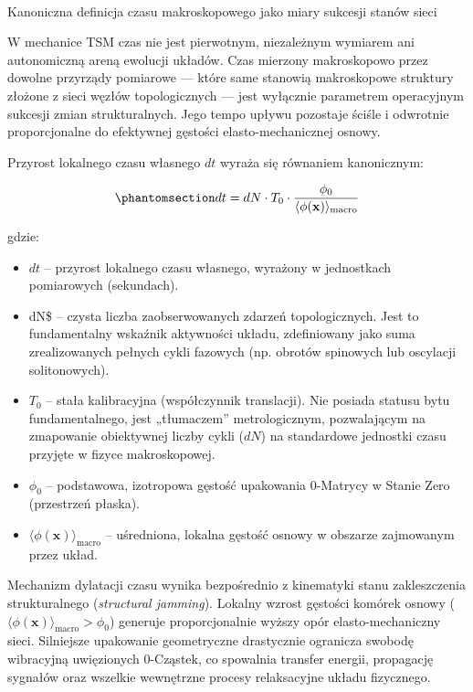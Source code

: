 \documentclass[
  polish,
  letterpaper,
  DIV=11,
  numbers=noendperiod,
  oneside]{scrartcl}
\makeatletter
\let\oldparagraph\paragraph
\renewcommand{\paragraph}{
    \@ifstar
      \xxxParagraphStar
      \xxxParagraphNoStar
  }
\newcommand{\xxxParagraphStar}[1]{\oldparagraph*{#1}\mbox{}}
\newcommand{\xxxParagraphNoStar}[1]{\oldparagraph{#1}\mbox{}}
\providecommand{\tightlist}{%
  \setlength{\itemsep}{0pt}\setlength{\parskip}{0pt}}
\makeatother
\begin{document}
\paragraph{Kanoniczna definicja czasu makroskopowego jako miary sukcesji
stanów sieci}\label{sec-1-2-3}

W mechanice TSM czas nie jest pierwotnym, niezależnym wymiarem ani
autonomiczną areną ewolucji układów. Czas mierzony makroskopowo przez
dowolne przyrządy pomiarowe --- które same stanowią makroskopowe
struktury złożone z sieci węzłów topologicznych --- jest wyłącznie
parametrem operacyjnym sukcesji zmian strukturalnych. Jego tempo upływu
pozostaje ściśle i odwrotnie proporcjonalne do efektywnej gęstości
elasto-mechanicznej osnowy.

Przyrost lokalnego czasu własnego \(dt\) wyraża się równaniem
kanonicznym:

\begin{equation}\protect\phantomsection\label{eq-1-2-5}{dt = dN \cdot T_0 \cdot \frac{\phi_0}{\langle\phi(\mathbf{x})\rangle_{\text{macro}}}}\end{equation}

gdzie:

\begin{itemize}
\tightlist
\item
  \(dt\) -- przyrost lokalnego czasu własnego, wyrażony w jednostkach
  pomiarowych (sekundach).
\item
  dN\$ -- czysta liczba zaobserwowanych zdarzeń topologicznych. Jest to
  fundamentalny wskaźnik aktywności układu, zdefiniowany jako suma
  zrealizowanych pełnych cykli fazowych (np. obrotów spinowych lub
  oscylacji solitonowych).
\item
  \(T_0\) -- stała kalibracyjna (współczynnik translacji). Nie posiada
  statusu bytu fundamentalnego, jest „tłumaczem'' metrologicznym,
  pozwalającym na zmapowanie obiektywnej liczby cykli (\(dN\)) na
  standardowe jednostki czasu przyjęte w fizyce makroskopowej.
\item
  \(\phi_0\) -- podstawowa, izotropowa gęstość upakowania 0-Matrycy w
  Stanie Zero (przestrzeń płaska).
\item
  \(\langle\phi(\mathbf{x})\rangle_{\text{macro}}\) -- uśredniona,
  lokalna gęstość osnowy w obszarze zajmowanym przez układ.
\end{itemize}

Mechanizm dylatacji czasu wynika bezpośrednio z kinematyki stanu
zakleszczenia strukturalnego (\emph{structural jamming}). Lokalny wzrost
gęstości komórek osnowy
(\(\langle\phi(\mathbf{x})\rangle_{\text{macro}} > \phi_0\)) generuje
proporcjonalnie wyższy opór elasto-mechaniczny sieci. Silniejsze
upakowanie geometryczne drastycznie ogranicza swobodę wibracyjną
uwięzionych 0-Cząstek, co spowalnia transfer energii, propagację
sygnałów oraz wszelkie wewnętrzne procesy relaksacyjne układu
fizycznego.
\end{document}
